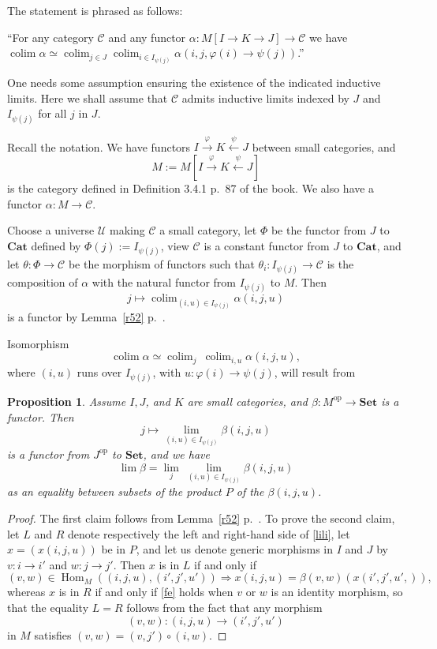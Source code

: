 \documentclass[12pt]{article}%
\newtheorem{prop}[thm]{Proposition}
\theoremstyle{remark}
\theoremstyle{definition}
\newcommand{\C}{\mathcal C}
\newcommand{\U}{\mathcal U}
\newcommand{\Cat}{\mathbf{Cat}}%
\newcommand{\Set}{\mathbf{Set}}
\newcommand{\then}{\Rightarrow}
\DeclareMathOperator*{\colim}{colim}
\DeclareMathOperator{\Hom}{Hom}%
\DeclareMathOperator{\op}{op}
\begin{document}
The statement is phrased as follows: 

``For any category $\C$ and any functor $\alpha:M[I\to K\rightarrow J]\to\C$ we have $\colim\alpha\simeq\colim_{j\in J}\colim_{i\in I_{\psi(j)}}\alpha(i,j,\varphi(i)\to\psi(j))$.'' 

One needs some assumption ensuring the existence of the indicated inductive limits. Here we shall assume that $\C$ admits inductive limits indexed by $J$ and $I_{\psi(j)}$ for all $j$ in $J$. 

Recall the notation. We have functors $I\xrightarrow\varphi K\xleftarrow\psi J$ between small categories, and 
$$
M:=M[I\xrightarrow\varphi K\xleftarrow\psi J] 
$$ 
is the category defined in Definition 3.4.1 p.~87 of the book. We also have a functor $\alpha:M\to\C$. 

Choose a universe $\U$ making $\C$ a small category, let $\Phi$ be the functor from $J$ to $\Cat$ defined by $\Phi(j):=I_{\psi(j)}$, view $\C$ is a constant functor from $J$ to $\Cat$, and let $\theta:\Phi\to\C$ be the morphism of functors such that $\theta_i:I_{\psi(j)}\to\C$ is the composition of $\alpha$ with the natural functor from $I_{\psi(j)}$ to $M$. Then 
$$
j\mapsto\colim_{(i,u)\in I_{\psi(j)}}\alpha(i,j,u) 
$$ 
is a functor by Lemma~\ref{r52} p.~\pageref{r52}. 

Isomorphism 
%
\begin{equation}\label{coco2}
\colim\alpha\simeq\colim_j\ \colim_{i,u}\alpha(i,j,u),
\end{equation} 
%
where $(i,u)$ runs over $I_{\psi(j)}$, with $u:\varphi(i)\to\psi(j)$, will result from 
%
\begin{prop}
%
Assume $I,J$, and $K$ are small categories, and $\beta:M^{\op}\to\Set$ is a functor. Then 
$$
j\mapsto\lim_{(i,u)\in I_{\psi(j)}}\beta(i,j,u)
$$ 
is a functor from $J^{\op}$ to $\Set$, and we have
%
\begin{equation}\label{lili} 
\lim\beta=\lim_j\ \lim_{(i,u)\in I_{\psi(j)}}\beta(i,j,u) 
\end{equation} 
%
as an equality between subsets of the product $P$ of the $\beta(i,j,u)$. 
%
\end{prop} 
%
\begin{proof}
The first claim follows from Lemma~\ref{r52} p.~\pageref{r52}. To prove the second claim, let $L$ and $R$ denote respectively the left and right-hand side of \eqref{lili}, let $x=(x(i,j,u))$ be in $P$, and let us denote generic morphisms in $I$ and $J$ by $v:i\to i'$ and $w:j\to j'$. Then $x$ is in $L$ if and only if 
%
\begin{equation}\label{fe} 
(v,w)\in\Hom_M((i,j,u),(i',j',u'))\then x(i,j,u)=\beta(v,w)(x(i',j',u',)), 
\end{equation} 
%
whereas $x$ is in $R$ if and only if \eqref{fe} holds when $v$ or $w$ is an identity morphism, so that the equality $L=R$ follows from the fact that any morphism 
$$
(v,w):(i,j,u)\to(i',j',u')
$$ 
in $M$ satisfies $(v,w)=(v,j')\circ(i,w)$.
\end{proof}
\end{document}
